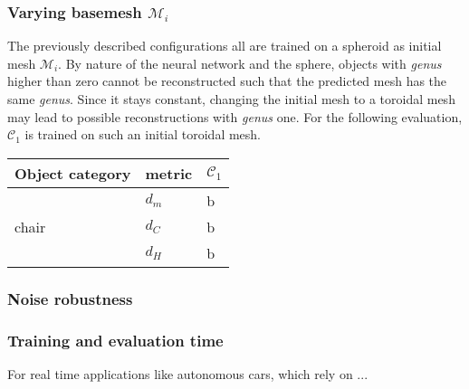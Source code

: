 \subsubsection*{Varying basemesh $\mathcal{M}_i$}
    The previously described configurations all are trained on a spheroid as initial mesh $\mathcal{M}_i$. 
    By nature of the neural network and the sphere, objects with \emph{genus} higher than zero cannot be
    reconstructed such that the predicted mesh has the same \emph{genus}. Since it stays constant, 
    changing the initial mesh to a toroidal mesh may lead to possible reconstructions with \emph{genus} one. 
    For the following evaluation, $\mathcal{C}_{1}$ is trained on such an initial toroidal mesh.

\begin{center}
     \label{tab:distance7500} 
    \begin{tabular}{| l | p{1.1cm} | p{1.2cm} |}
        \hline
        Object category& metric& $\mathcal{C}_1$\\ \hline
        \multirow{3}{*}{chair}&$d_m$&b\\ 
        &$d_C$&b\\
        &$d_H$&b\\
        \hline
    \end{tabular}
\end{center}

\subsubsection*{Noise robustness}

\subsubsection*{Training and evaluation time}
For real time applications like autonomous cars, which rely on ...

